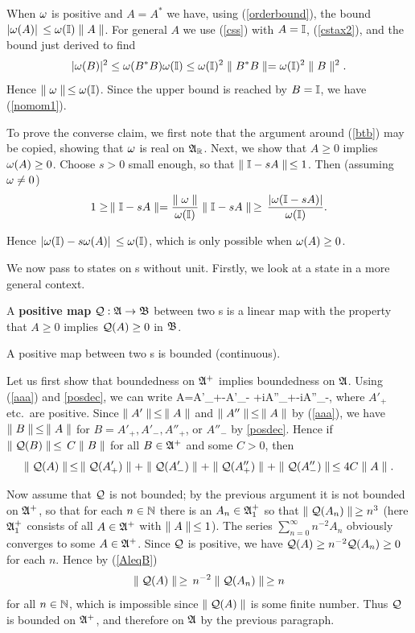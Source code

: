 When $\omega$ is positive and $A=A^*$ we have, using (\ref{orderbound}),
the bound $|\omega(A)|\,\leq \omega({\Bbb I}) \parallel A\parallel$.  For general $A$ we use
(\ref{css}) with $A={\Bbb I}$, (\ref{cstax2}), and the bound just derived to
find
$$
|\omega(B)|^2\leq\omega(B^*B)\omega({\Bbb I})\leq \omega({\Bbb I})^2 \parallel B^*B\parallel= \omega({\Bbb I})^2 \parallel
B\parallel^2.
$$
Hence $\parallel\omega\parallel\,\leq \omega({\Bbb I})$. Since the upper bound is reached by
$B={\Bbb I}$, we have (\ref{nomom1}).

To prove the converse claim, we first note that the argument around
(\ref{btb}) may be copied, showing that $\omega$ is real on ${\frak A}_{\Bbb R}$. Next,
we show that $A\geq 0$ implies $\omega(A)\geq 0$. Choose $s>0$ small
enough, so that $\parallel {\Bbb I}-sA\parallel\,\leq 1$. Then (assuming $\omega\neq 0$)
$$
1\geq\,\parallel {\Bbb I}-sA\parallel=\frac{\parallel\omega\parallel}{\omega({\Bbb I})}\parallel {\Bbb I}-sA\parallel
\,\geq\,\frac{|\omega({\Bbb I}-sA)|}{\omega({\Bbb I})}.$$

Hence $|\omega({\Bbb I})-s\omega(A)|\,\leq \omega({\Bbb I})$, which is only possible when
$\omega(A)\geq 0$.\enp

We now pass to states on \ca s without unit. Firstly, we look at a
state in a more general context.
\begin{Definition}
A {\bf positive map} ${\cal Q}:{\frak A}\rightarrow{\frak B}$ between two \ca s is a linear map
with the property that $A\geq 0$ implies ${\cal Q}(A)\geq 0$ in
${\frak B}$. \end{Definition}
\begin{Proposition}
A positive map between two \ca s is bounded (continuous).
 \end{Proposition}

Let us first show that boundedness on ${\frak A}^+$ implies boundedness on
${\frak A}$.  Using (\ref{aaa}) and \ref{posdec}, we can write \be
A=A'_+-A'_- +iA''_+-iA''_-,  \ee where $A'_+$ etc.\ are
positive.  Since $\parallel A'\parallel\,\leq\,\parallel A\parallel$ and $\parallel A''\parallel\,\leq\,\parallel A\parallel$
by (\ref{aaa}), we have $\parallel B\parallel\,\leq\,\parallel A\parallel$ for
$B=A'_+,A'_-,A''_+$, or $A''_-$ by \ref{posdec}.  Hence if
$\parallel{\cal Q}(B)\parallel\,\leq\,C \parallel B\parallel$ for all $B\in{\frak A}^+$ and some $C>0$, then
$$
\parallel{\cal Q}(A)\parallel \,\leq\,\parallel{\cal Q}(A'_+)\parallel+
\parallel{\cal Q}(A'_-)\parallel+\parallel{\cal Q}(A''_+)\parallel+\parallel{\cal Q}(A''_-)\parallel\,\leq 4C\parallel A\parallel.
$$

Now assume that ${\cal Q}$ is not bounded; by the previous argument it is
not bounded on ${\frak A}^+$, so that for each $n\in{\Bbb N}$ there is an
$A_n\in{\frak A}_1^+$ so that $\parallel{\cal Q}(A_n)\parallel\,\geq n^3$ (here ${\frak A}^+_1$
consists of all $A\in{\frak A}^+$ with $\parallel A\parallel\,\leq 1$). The series
$\sum_{n=0}^{\infty} n^{-2}A_n$ obviously converges to some
$A\in{\frak A}^+$. Since ${\cal Q}$ is positive, we have ${\cal Q}(A)\geq n^{-2}
{\cal Q}(A_n)\geq 0$ for each $n$. Hence by (\ref{AleqB})
$$
\parallel{\cal Q}(A)\parallel\,\geq\, n^{-2} \parallel{\cal Q}(A_n)\parallel\,\geq n
$$
for all $n\in{\Bbb N}$, which is impossible since $\parallel{\cal Q}(A)\parallel$ is some
finite number. Thus ${\cal Q}$ is bounded on ${\frak A}^+$, and therefore on ${\frak A}$
by the previous paragraph.\enp

